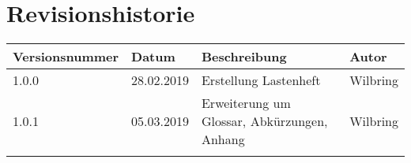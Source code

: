 \section*{Revisionshistorie}
\begin{tabular}{|p{3cm}|p{2cm}|p{5.5cm}|p{2cm}|}
\hline
Versionsnummer  & Datum         & Beschreibung          & Autor     \\
\hline
 1.0.0          & 28.02.2019    & Erstellung Lastenheft & Wilbring  \\\hline
 1.0.1          & 05.03.2019    & Erweiterung um Glossar, Abkürzungen, Anhang  & Wilbring       \\\hline
                &               &                       &           \\\hline
\end{tabular}

